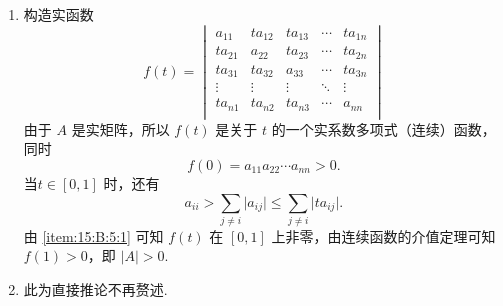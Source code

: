 \begin{exercise}
\begin{exgroup}
\begin{answer}
\begin{enumerate}
                \item 构造实函数
                      \[f(t) = \begin{vmatrix}
                              a_{11}  & ta_{12} & ta_{13} & \cdots & ta_{1n} \\
                              ta_{21} & a_{22}  & ta_{23} & \cdots & ta_{2n} \\
                              ta_{31} & ta_{32} & a_{33}  & \cdots & ta_{3n} \\
                              \vdots  & \vdots  & \vdots  & \ddots & \vdots  \\
                              ta_{n1} & ta_{n2} & ta_{n3} & \cdots & a_{nn}  \\
                          \end{vmatrix}\]
                      由于 $A$ 是实矩阵，所以 $f(t)$ 是关于 $t$ 的一个实系数多项式（连续）函数，同时
                      \[f(0) = a_{11}a_{22}\cdots a_{nn} > 0.\] 当$t \in [0, 1]$ 时，还有
                      \[a_{ii} > \sum_{j \neq i} \lvert a_{ij} \rvert \leqslant \sum_{j \neq i} \lvert ta_{ij} \rvert.\]
                      由 \ref*{item:15:B:5:1} 可知 $f(t)$ 在 $[0, 1]$ 上非零，由连续函数的介值定理可知 $f(1) > 0$，即 $\lvert A \rvert > 0$.

                \item 此为直接推论不再赘述.
            \end{enumerate}
        \end{answer}
    \end{exgroup}
\end{exercise}
